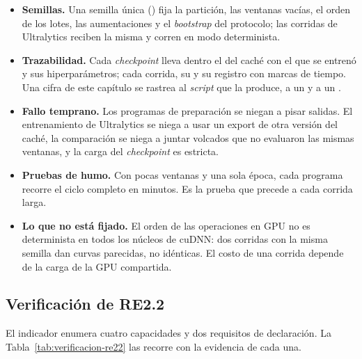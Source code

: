 \begin{itemize}[nosep]
    \item \textbf{Semillas.} Una semilla única (\pSeed{}) fija la partición, las
          ventanas vacías, el orden de los lotes, las aumentaciones y el
          \textit{bootstrap} del protocolo; las corridas de Ultralytics reciben la
          misma y corren en modo determinista.
    \item \textbf{Trazabilidad.} Cada \textit{checkpoint} lleva dentro el
           del caché con el que se entrenó y sus hiperparámetros;
          cada corrida, su  y su registro con marcas de tiempo.
          Una cifra de este capítulo se rastrea al \textit{script} que la
          produce, a un  y a un .
    \item \textbf{Fallo temprano.} Los programas de preparación se niegan a
          pisar salidas. El entrenamiento de Ultralytics se niega a usar un
          export de otra versión del caché, la comparación se niega a juntar
          volcados que no evaluaron las mismas ventanas, y la carga del
          \textit{checkpoint} es estricta.
    \item \textbf{Pruebas de humo.} Con pocas ventanas y una sola época, cada
          programa recorre el ciclo completo en minutos. Es la prueba que precede
          a cada corrida larga.
    \item \textbf{Lo que no está fijado.} El orden de las operaciones en GPU no es
          determinista en todos los núcleos de cuDNN: dos corridas con la misma
          semilla dan curvas parecidas, no idénticas. El costo de una corrida
          depende de la carga de la GPU compartida.
\end{itemize}

\subsection{Verificación de RE2.2}
\label{sec:verificacion-re22}

El indicador enumera cuatro capacidades y dos requisitos de declaración. La
Tabla~\ref{tab:verificacion-re22} las recorre con la evidencia de cada una.

